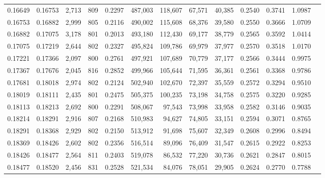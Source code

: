 \begin{tabular}{rrrrrrrrrrrrr}
0.16649 & 0.16753 &  2,713 & 809 &                                     0.2297 & 487,003 & 118,607 &  67,571 &  40,385 & 0.2540 & 0.3741 & 1.0987 \\
0.16753 & 0.16882 &  2,999 & 805 &                                     0.2116 & 490,002 & 115,608 &  68,376 &  39,580 & 0.2550 & 0.3666 & 1.0709 \\
0.16882 & 0.17075 &  3,178 & 801 &                                     0.2013 & 493,180 & 112,430 &  69,177 &  38,779 & 0.2565 & 0.3592 & 1.0414 \\
0.17075 & 0.17219 &  2,644 & 802 &                                     0.2327 & 495,824 & 109,786 &  69,979 &  37,977 & 0.2570 & 0.3518 & 1.0170 \\
0.17221 & 0.17366 &  2,097 & 800 &                                     0.2761 & 497,921 & 107,689 &  70,779 &  37,177 & 0.2566 & 0.3444 & 0.9975 \\
0.17367 & 0.17676 &  2,045 & 816 &                                     0.2852 & 499,966 & 105,644 &  71,595 &  36,361 & 0.2561 & 0.3368 & 0.9786 \\
0.17681 & 0.18018 &  2,974 & 802 &                                     0.2124 & 502,940 & 102,670 &  72,397 &  35,559 & 0.2572 & 0.3294 & 0.9510 \\
0.18019 & 0.18111 &  2,435 & 801 &                                     0.2475 & 505,375 & 100,235 &  73,198 &  34,758 & 0.2575 & 0.3220 & 0.9285 \\
0.18113 & 0.18213 &  2,692 & 800 &                                     0.2291 & 508,067 &  97,543 &  73,998 &  33,958 & 0.2582 & 0.3146 & 0.9035 \\
0.18214 & 0.18291 &  2,916 & 807 &                                     0.2168 & 510,983 &  94,627 &  74,805 &  33,151 & 0.2594 & 0.3071 & 0.8765 \\
0.18291 & 0.18368 &  2,929 & 802 &                                     0.2150 & 513,912 &  91,698 &  75,607 &  32,349 & 0.2608 & 0.2996 & 0.8494 \\
0.18369 & 0.18426 &  2,602 & 802 &                                     0.2356 & 516,514 &  89,096 &  76,409 &  31,547 & 0.2615 & 0.2922 & 0.8253 \\
0.18426 & 0.18477 &  2,564 & 811 &                                     0.2403 & 519,078 &  86,532 &  77,220 &  30,736 & 0.2621 & 0.2847 & 0.8015 \\
0.18477 & 0.18520 &  2,456 & 831 &                                     0.2528 & 521,534 &  84,076 &  78,051 &  29,905 & 0.2624 & 0.2770 & 0.7788 \\

\end{tabular}
